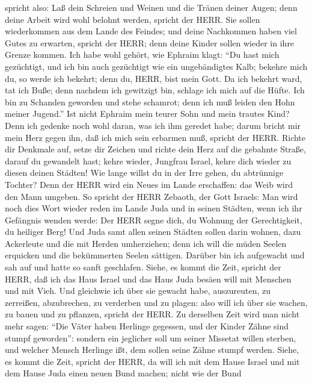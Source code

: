 spricht also: Laß dein Schreien und Weinen und die Tränen deiner Augen;
denn deine Arbeit wird wohl belohnt werden, spricht der HERR. Sie sollen
wiederkommen aus dem Lande des Feindes;  und deine
Nachkommen haben viel Gutes zu erwarten, spricht der HERR; denn deine
Kinder sollen wieder in ihre Grenze kommen.  Ich habe wohl
gehört, wie Ephraim klagt: ``Du hast mich gezüchtigt, und ich bin auch
gezüchtigt wie ein ungebändigtes Kalb; bekehre mich du, so werde ich
bekehrt; denn du, HERR, bist mein Gott.  Da ich bekehrt
ward, tat ich Buße; denn nachdem ich gewitzigt bin, schlage ich mich auf
die Hüfte. Ich bin zu Schanden geworden und stehe schamrot; denn ich muß
leiden den Hohn meiner Jugend.''  Ist nicht Ephraim mein
teurer Sohn und mein trautes Kind? Denn ich gedenke noch wohl daran, was
ich ihm geredet habe; darum bricht mir mein Herz gegen ihn, daß ich mich
sein erbarmen muß, spricht der HERR.  Richte dir Denkmale
auf, setze dir Zeichen und richte dein Herz auf die gebahnte Straße,
darauf du gewandelt hast; kehre wieder, Jungfrau Israel, kehre dich
wieder zu diesen deinen Städten!  Wie lange willst du in
der Irre gehen, du abtrünnige Tochter? Denn der HERR wird ein Neues im
Lande erschaffen: das Weib wird den Mann umgeben.  So
spricht der HERR Zebaoth, der Gott Israels: Man wird noch dies Wort
wieder reden im Lande Juda und in seinen Städten, wenn ich ihr Gefängnis
wenden werde: Der HERR segne dich, du Wohnung der Gerechtigkeit, du
heiliger Berg!  Und Juda samt allen seinen Städten sollen
darin wohnen, dazu Ackerleute und die mit Herden umherziehen;
 denn ich will die müden Seelen erquicken und die
bekümmerten Seelen sättigen.  Darüber bin ich aufgewacht
und sah auf und hatte so sanft geschlafen.  Siehe, es kommt
die Zeit, spricht der HERR, daß ich das Haus Israel und das Haus Juda
besäen will mit Menschen und mit Vieh.  Und gleichwie ich
über sie gewacht habe, auszureuten, zu zerreißen, abzubrechen, zu
verderben und zu plagen: also will ich über sie wachen, zu bauen und zu
pflanzen, spricht der HERR.  Zu derselben Zeit wird man
nicht mehr sagen: ``Die Väter haben Herlinge gegessen, und der Kinder
Zähne sind stumpf geworden'':  sondern ein jeglicher soll
um seiner Missetat willen sterben, und welcher Mensch Herlinge ißt, dem
sollen seine Zähne stumpf werden.  Siehe, es kommt die
Zeit, spricht der HERR, da will ich mit dem Hause Israel und mit dem
Hause Juda einen neuen Bund machen;  nicht wie der Bund
